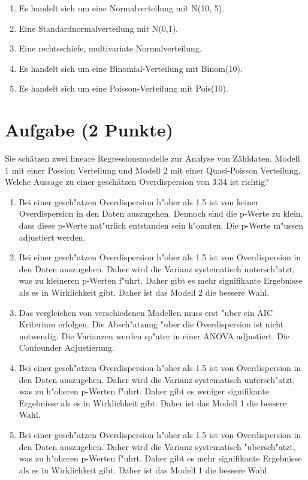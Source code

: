 \documentclass[a4paper, 10pt]{scrartcl}\usepackage[]{graphicx}\usepackage[]{xcolor}
\begin{document}
\begin{enumerate}
\item [\textbf{A} \msquare] Es handelt sich um eine Normalverteilung mit N(10, 5).
\item [\textbf{B} \msquare] Eine Standardnormalverteilung mit N(0,1).
\item [\textbf{C} \msquare] Eine rechtsschiefe, multivariate Normalverteilung.
\item [\textbf{D} \msquare] Es handelt sich um eine Binomial-Verteilung mit Binom(10).
\item [\textbf{E} \msquare] Es handelt sich um eine Poisson-Verteilung mit Pois(10).
\end{enumerate} 

\section{Aufgabe \hfill (2 Punkte)}



Sie sch{\"a}tzen zwei lineare Regressionsmodelle zur Analyse von
Z{\"a}hldaten. Modell 1 mit einer Possion Verteilung und Modell 2 mit einer
Quasi-Poisson Verteilung. Welche Aussage zu einer gesch{\"a}tzen Overdispersion
von 3.34 ist richtig?




\begin{enumerate}
\item [\textbf{A} \msquare] Bei einer gesch{"a}tzen Overdispersion h{"o}her als 1.5 ist von keiner Overdispersion in den Daten auszugehen. Dennoch sind die p-Werte zu klein, dass diese p-Werte nat{"u}rlich entstanden sein k{"o}nnten. Die p-Werte m{"u}ssen adjustiert werden.
\item [\textbf{B} \msquare] Bei einer gesch{"a}tzen Overdispersion h{"o}her als 1.5 ist von Overdispersion in den Daten auszugehen. Daher wird die Varianz systematisch untersch{"a}tzt, was zu kleineren p-Werten f{"u}hrt. Daher gibt es mehr signifikante Ergebnisse als es in Wirklichkeit gibt. Daher ist das Modell 2 die bessere Wahl.
\item [\textbf{C} \msquare] Das vergleichen von verschiedenen Modellen muss erst {"u}ber ein AIC Kriterium erfolgen. Die Absch{"a}tzung {"u}ber die Overdispersion ist nicht notwendig. Die Varianzen werden sp{"a}ter in einer ANOVA adjustiert. Die Confounder Adjustierung.
\item [\textbf{D} \msquare] Bei einer gesch{"a}tzen Overdispersion h{"o}her als 1.5 ist von Overdispersion in den Daten auszugehen. Daher wird die Varianz systematisch untersch{"a}tzt, was zu h{"o}heren p-Werten f{"u}hrt. Daher gibt es weniger signifikante Ergebnisse als es in Wirklichkeit gibt. Daher ist das Modell 1 die bessere Wahl.
\item [\textbf{E} \msquare] Bei einer gesch{"a}tzen Overdispersion h{"o}her als 1.5 ist von Overdispersion in den Daten auszugehen. Daher wird die Varianz systematisch {"u}bersch{"a}tzt, was zu h{"o}heren p-Werten f{"u}hrt. Daher gibt es mehr signifikante Ergebnisse als es in Wirklichkeit gibt. Daher ist das Modell 1 die bessere Wahl
\end{enumerate}
\end{document}
